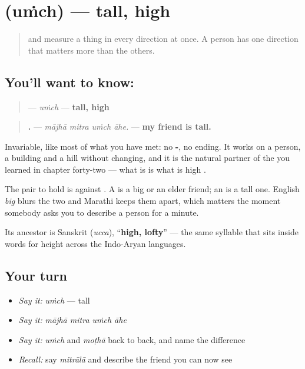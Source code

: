 \section[\texorpdfstring{\mr{उंच} (uṁch)}{उंच (uṁch)}]{ (uṁch) — tall, high}

\label{lesson:MR-C52-unch}



\begin{quote}
\textbf{} and \textbf{} measure a thing in every direction at once. A person has one direction that matters more than the others.
\end{quote}

\subsection*{You'll want to know: }
\begin{quote}
\textbf{} — \emph{uṁch} — \textbf{tall, high}
\end{quote}

\begin{quote}
\textbf{   .} — \emph{mājhā mitra uṁch āhe.} — \textbf{my friend is tall.}
\end{quote}

Invariable, like most of what you have met: no \textbf{-}, no ending. It works on a person, a building and a hill without changing, and it is the natural partner of the \textbf{} you learned in chapter forty-two — what is \textbf{} is what is high \textbf{}.

The pair to hold is \textbf{} against \textbf{}. A \textbf{ } is a big or an elder friend; an \textbf{ } is a tall one. English \emph{big} blurs the two and Marathi keeps them apart, which matters the moment somebody asks you to describe a person for a minute.

Its ancestor is Sanskrit \textbf{} (\emph{ucca}), \textquotedblleft{}\textbf{high, lofty}\textquotedblright{} — the same syllable that sits inside words for height across the Indo-Aryan languages.

\subsection*{Your turn}
\begin{itemize}
\raggedright
  \item \emph{Say it:} \emph{uṁch} — tall
  \item \emph{Say it:} \emph{mājhā mitra uṁch āhe}
  \item \emph{Say it:} \emph{uṁch} and \emph{moṭhā} back to back, and name the difference
  \item \emph{Recall:} say \emph{mitrālā} and describe the friend you can now see
\end{itemize}

